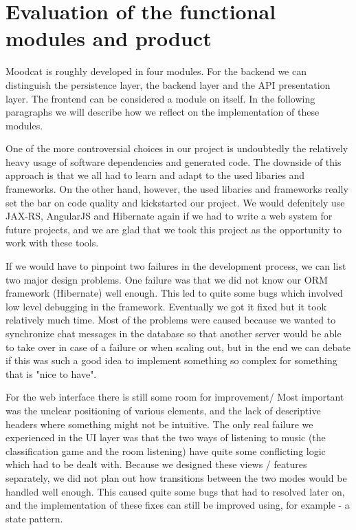 
\chapter{Evaluation of the functional modules and product}

Moodcat is roughly developed in four modules.
For the backend we can distinguish the persistence layer, the backend layer and the API presentation layer.
The frontend can be considered a module on itself.
In the following paragraphs we will describe how we reflect on the implementation of these modules.

One of the more controversial choices in our project is undoubtedly the relatively heavy usage of software dependencies and generated code.
The downside of this approach is that we all had to learn and adapt to the used libaries and frameworks.
On the other hand, however, the used libaries and frameworks really set the bar on code quality and kickstarted our project.
We would defenitely use JAX-RS, AngularJS and Hibernate again if we had to write a web system for future projects, and we are glad that we took this project as the opportunity to work with these tools.

If we would have to pinpoint two failures in the development process, we can list two major design problems. One failure was that we did not know our ORM framework (Hibernate) well enough. This led to quite some bugs which involved low level debugging in the framework.
Eventually we got it fixed but it took relatively much time. Most of the problems were caused because we wanted to synchronize chat messages in the database so that another server would be able to take over in case of a failure or when scaling out, but in the end we can debate if this was such a good idea to implement something so complex for something that is "nice to have".

For the web interface there is still some room for improvement/ Most important was the unclear positioning of various elements, and the lack of descriptive headers where something might not be intuitive.
The only real failure we experienced in the UI layer was that the two ways of listening to music (the classification game and the room listening) have quite some conflicting logic which had to be dealt with.
Because we designed these views / features separately, we did not plan out how transitions between the two modes would be handled well enough. This caused quite some bugs that had to resolved later on, and the implementation of these fixes can still be improved using, for example - a state pattern.

